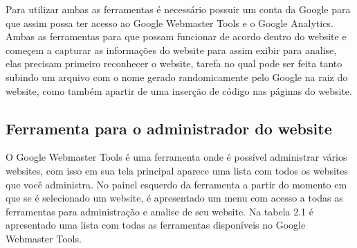 \documentclass[
	12pt,				%
	openright,			%
	twoside,			%
	a4paper,			%
	english,			%
	french,				%
	spanish,			%
	brazil				%
	]{abntex2}
\begin{document}
Para utilizar ambas as ferramentas é necessário possuir um conta da Google para que assim possa ter acesso ao Google Webmaster Tools e o Google Analytics. Ambas as ferramentas para que possam funcionar de acordo dentro do website e começem a capturar as informações do website para assim exibir para analise, elas precisam primeiro reconhecer o website, tarefa no qual pode ser feita tanto subindo um arquivo com o nome gerado randomicamente pelo Google na raiz do website, como também apartir de uma inserção de código nas páginas do website.

\subsection{Ferramenta para o administrador do website}

O Google Webmaster Tools é uma ferramenta onde é possível administrar vários websites, com isso em sua tela principal aparece uma lista com todos os websites que você administra. No painel esquerdo da ferramenta a partir do momento em que se é selecionado um website, é apresentado um menu com acesso a todas as ferramentas para administração e analise de seu website. Na tabela 2.1 é apresentado uma lista com todas as ferramentas disponíveis no Google Webmaster Tools.
\end{document}
